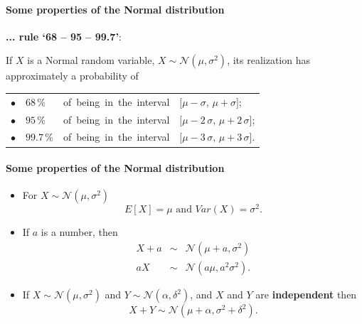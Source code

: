 \documentclass[notes=show,smaller]{beamer}\usepackage[]{graphicx}\usepackage[]{color}
\newcommand{\N}{\mathcal{N}}
\newenvironment{stepitemize}{\begin{itemize}[<+->]}{\end{itemize} }
\begin{document}
\begin{frame}{\subsecname}
\framesubtitle{Some properties of the Normal distribution}
  \textbf{... rule `68 -- 95 -- 99.7'}: \\ \bigskip

  If $X$ is a Normal random variable, $X \sim \N(\mu, \sigma^2)$, its realization has approximately a probability of \\ \bigskip

  \begin{tabular}{llll}
  $\bullet$
  &
  $68 \, \%$
  &
  \mbox{of being in the interval}
  &
  $\lbrack \mu - \sigma, \, \mu + \sigma \rbrack$;\\[0.2cm]
  $\bullet$
  &
  $95 \, \%$
  &
  \mbox{of being in the interval}
  &
  $\lbrack \mu - 2 \, \sigma, \, \mu + 2 \, \sigma \rbrack$;\\[0.2cm]
  $\bullet$
  &
  $99.7 \, \%$
  &
  \mbox{of being in the interval}&
  $\lbrack \mu - 3 \, \sigma, \, \mu + 3 \, \sigma \rbrack$.\\[0.2cm]
  \end{tabular}
\end{frame}

\begin{frame}{\subsecname}
\framesubtitle{Some properties of the Normal distribution}

  \begin{stepitemize}
  \item For $X\sim \N\left( \mu ,\sigma ^{2}\right) $
  \begin{equation*}
  E\left[ X\right] =\mu \text{ and }Var\left( X\right) =\sigma ^{2}.
  \end{equation*}

  \item If $a$ is a number, then
  \begin{eqnarray*}
  X+a &\sim &\N\left( \mu +a,\sigma ^{2}\right) \\
  aX &\sim &\N\left( a\mu ,a^{2}\sigma ^{2}\right).
  \end{eqnarray*}

  \item If $X\sim \N\left( \mu ,\sigma ^{2}\right) $ and $Y\sim \N\left( \alpha
  ,\delta ^{2}\right) $, and $X$ and $Y$ are \textbf{independent} then%
  \begin{equation*}
  X+Y\sim \N\left( \mu +\alpha ,\sigma ^{2}+\delta ^{2}\right).
  \end{equation*}

  \end{stepitemize}
\end{frame}
\end{document}

